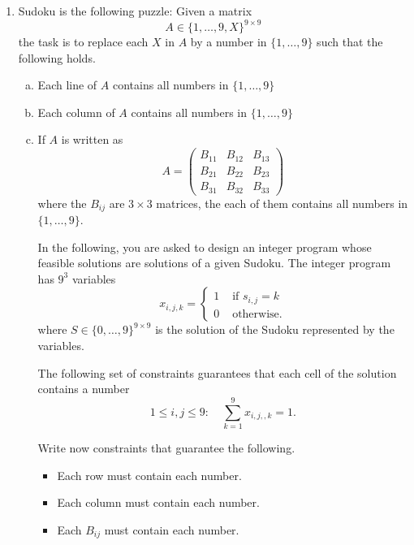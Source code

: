 \documentclass[11pt]{article}
\institute{\'Ecole Polytechnique F\'ed\'erale de Lausanne}
\begin{document}
\makeheader

\begin{enumerate}[1)]

\item Sudoku is the following puzzle: Given a matrix
  \begin{displaymath}
    A ∈ \{1,\dots,9,X\}^{9 ×9} 
  \end{displaymath}
  the task is to replace each $X$ in $A$ by a number in $\{1,\dots,9\}$ such that the following holds.
  \begin{enumerate}[a)] 
  \item Each line of $A$ contains all numbers in  $\{1,\dots,9\}$
  \item Each column of $A$ contains all numbers in  $\{1,\dots,9\}$
  \item If $A$ is written as
    \begin{displaymath}
      A =
      \begin{pmatrix}
        B_{11} & B_{12} & B_{13} \\
        B_{21} & B_{22} & B_{23} \\
        B_{31} & B_{32} & B_{33} 
      \end{pmatrix}
    \end{displaymath}
    where the $B_{ij}$ are $3 ×3$ matrices, the each of them contains all numbers in  $\{1,\dots,9\}$.

    \bigskip \noindent

    In the following, you are asked to design an integer program whose feasible solutions are solutions of a given Sudoku. The integer program has $9^3$ variables
    \begin{displaymath}
      x_{i,j,k} =
      \begin{cases}
        1 & \text{ if } s_{i,j} = k \\
        0 & \text{ otherwise.} 
      \end{cases}
    \end{displaymath}
    where $S ∈ \{0,\dots,9\}^{9 ×9}$ is the solution of the Sudoku represented by the variables. 


    The following set of constraints guarantees that each cell of the solution contains a number
    \begin{displaymath}
      1≤i,j≤9: \quad  ∑_{k=1}^9 x_{i,j,,k} = 1. 
    \end{displaymath}

    Write now constraints that guarantee the following.
    \begin{itemize}
    \item Each row must contain each number.
    \item Each column must contain each number.
    \item Each $B_{ij}$ must contain each number. 
    \end{itemize}


\end{enumerate}
\end{enumerate}
\end{document}
